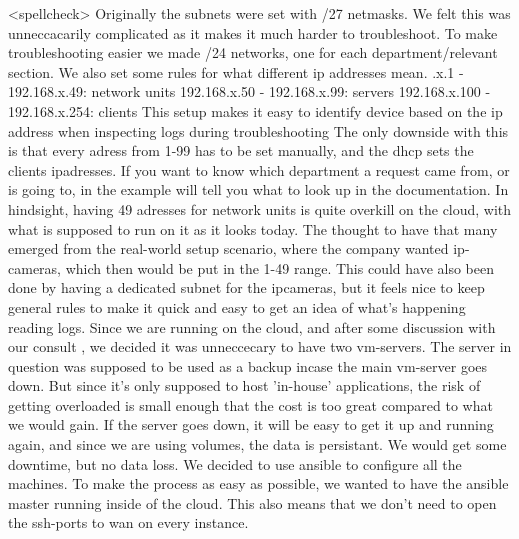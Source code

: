 \markdownRendererInterblockSeparator
{}\markdownRendererInterblockSeparator
{}\markdownRendererInterblockSeparator
{}<spellcheck> Originally the subnets were set with /27 netmasks.\markdownRendererLineBreak
{}We felt this was unneccacarily complicated as it makes it much harder to troubleshoot.\markdownRendererInterblockSeparator
{}To make troubleshooting easier we made /24 networks, one for each department/relevant section.\markdownRendererInterblockSeparator
{}\markdownRendererInterblockSeparator
{}We also set some rules for what different ip addresses  mean.\markdownRendererInterblockSeparator
{}.x.1 - 192.168.x.49: network units\markdownRendererLineBreak
{}192.168.x.50 - 192.168.x.99: servers\markdownRendererLineBreak
{}192.168.x.100 - 192.168.x.254: clients
\markdownRendererBlockQuoteEnd \markdownRendererInterblockSeparator
{}This setup makes it easy to identify device based on the ip address when inspecting logs during troubleshooting \markdownRendererInterblockSeparator
{}The only downside with this is that every adress from 1-99 has to be set manually, and the dhcp sets the clients ipadresses.\markdownRendererInterblockSeparator
{}If you want to know which department a request came from, or is going to,  in the example will tell you what to look up in the documentation.\markdownRendererInterblockSeparator
{}In hindsight, having 49 adresses for network units is quite overkill on the cloud, with what is supposed to run on it as it looks today. The thought to have that many emerged from the real-world setup scenario, where the company wanted ip-cameras, which then would be put in the 1-49 range.\markdownRendererInterblockSeparator
{}This could have also been done by having a dedicated subnet for the ipcameras, but it feels nice to keep general rules to make it quick and easy to get an idea of what's happening reading logs.\markdownRendererInterblockSeparator
{}\markdownRendererInterblockSeparator
{}\markdownRendererInterblockSeparator
{}Since we are running on the cloud, and after some discussion with our consult , we decided it was unneccecary to have two vm-servers. \markdownRendererInterblockSeparator
{}The server in question was supposed to be used as a backup incase the main vm-server goes down. But since it's only supposed to host 'in-house' applications, the risk of getting overloaded is small enough that the cost is too great compared to what we would gain.\markdownRendererInterblockSeparator
{}If the server goes down, it will be easy to get it up and running again, and since we are using volumes, the data is persistant. We would get some downtime, but no data loss.\markdownRendererInterblockSeparator
{}\markdownRendererInterblockSeparator
{}We decided to use ansible to configure all the machines. To make the process as easy as possible, we wanted to have the ansible master running inside of the cloud. This also means that we don't need to open the ssh-ports to wan on every instance.\relax